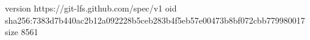 version https://git-lfs.github.com/spec/v1
oid sha256:7383d7b440ac2b12a092228b5ceb283b4f5eb57e00473b8bf072cbb779980017
size 8561
